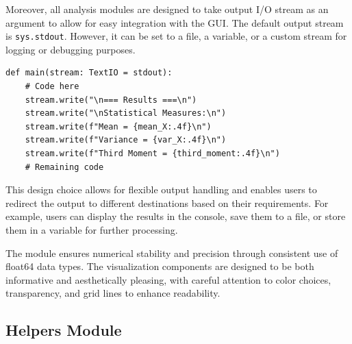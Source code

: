 \documentclass{article}
\begin{document}
Moreover, all analysis modules are designed to take output I/O stream as an argument to allow for easy integration with the GUI. The default output stream is \texttt{sys.stdout}. However, it can be set to a file, a variable, or a custom stream for logging or debugging purposes.

\begin{verbatim}
def main(stream: TextIO = stdout):
    # Code here
    stream.write("\n=== Results ===\n")
    stream.write("\nStatistical Measures:\n")
    stream.write(f"Mean = {mean_X:.4f}\n")
    stream.write(f"Variance = {var_X:.4f}\n")
    stream.write(f"Third Moment = {third_moment:.4f}\n")
    # Remaining code
\end{verbatim}

This design choice allows for flexible output handling and enables users to redirect the output to different destinations based on their requirements. For example, users can display the results in the console, save them to a file, or store them in a variable for further processing.

The module ensures numerical stability and precision through consistent use of float64 data types. The visualization components are designed to be both informative and aesthetically pleasing, with careful attention to color choices, transparency, and grid lines to enhance readability.

\subsection{Helpers Module}
\end{document}
